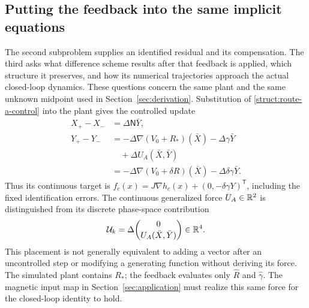 \subsection{Putting the feedback into the same implicit equations}
\label{ctrl:placement}

The second subproblem supplies an identified residual and its compensation. The third asks what difference scheme results after that feedback is applied, which structure it preserves, and how its numerical trajectories approach the actual closed-loop dynamics. These questions concern the same plant and the same unknown midpoint used in Section~\ref{sec:derivation}. Substitution of \eqref{struct:route-a-control} into the plant gives the controlled update
\begin{equation}\label{ctrl:midpoint}
\begin{aligned}
 X_+-X_-&=\Delta\mathsf N\bar Y,\\
 Y_+-Y_-&=-\Delta\nabla(V_0+R_*)(\bar X)
               -\Delta\gamma\bar Y\\
        &\quad+\Delta U_A(\bar X,\bar Y)\\
        &=-\Delta\nabla(V_0+\delta R)(\bar X)
               -\Delta\delta\gamma\bar Y.
\end{aligned}
\end{equation}
Thus its continuous target is
$f_c(x)=J\nabla h_c(x)+(0,-\delta\gamma Y)^{\mathsf T}$, including the fixed identification errors. The continuous generalized force $U_A\in\mathbb R^2$ is distinguished from its discrete phase-space contribution
\begin{equation}\label{ctrl:control-increment}
 \mathcal U_k=\Delta\binom{0}{U_A(\bar X,\bar Y)}\in\mathbb R^4.
\end{equation}
This placement is not generally equivalent to adding a vector after an uncontrolled step or modifying a generating function without deriving its force. The simulated plant contains $R_*$; the feedback evaluates only $\widehat R$ and $\widehat\gamma$. The magnetic input map in Section~\ref{sec:application} must realize this same force for the closed-loop identity to hold.

